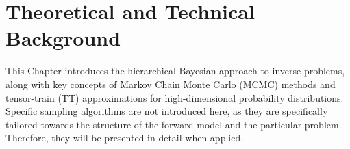 \chapter{Theoretical and Technical Background}
\label{ch:background}

This Chapter introduces the hierarchical Bayesian approach to inverse problems, along with key concepts of Markov Chain Monte Carlo (MCMC) methods and tensor-train (TT) approximations for high-dimensional probability distributions.
Specific sampling algorithms are not introduced here, as they are specifically tailored towards the structure of the forward model and the particular problem. Therefore, they will be presented in detail when applied.


